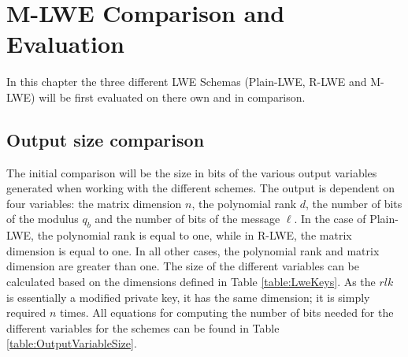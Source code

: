 \chapter{M-LWE Comparison and Evaluation}


In this chapter the three different LWE Schemas (Plain-LWE, R-LWE and M-LWE) will be first evaluated on there own and in comparison.

\section{Output size comparison}

The initial comparison will be the size in bits of the various output variables generated when working with the different schemes. The output is dependent on four variables: the matrix dimension $n$, the polynomial rank $d$, the number of bits of the modulus $q_b$ and the number of bits of the message $\ell$. In the case of Plain-LWE, the polynomial rank is equal to one, while in R-LWE, the matrix dimension is equal to one. In all other cases, the polynomial rank and matrix dimension are greater than one. The size of the different variables can be calculated based on the dimensions defined in Table \ref{table:LweKeys}. As the $rlk$ is essentially a modified private key, it has the same dimension; it is simply required $n$ times. All equations for computing the number of bits needed for the different variables for the schemes can be found in Table \ref{table:OutputVariableSize}. 

